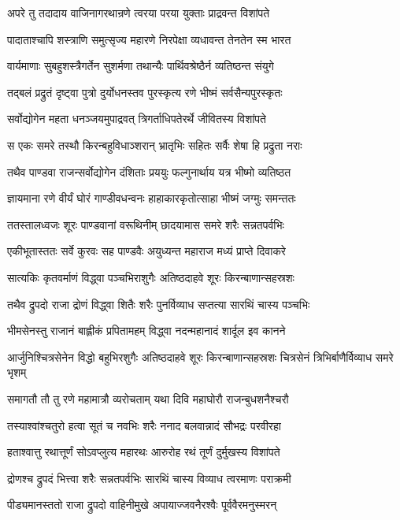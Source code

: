 \twolineshloka
{अपरे तु तदादाय वाजिनागरथान्रणे}
{त्वरया परया युक्ताः प्राद्रवन्त विशांपते}


\twolineshloka
{पादाताश्चापि शस्त्राणि समुत्सृज्य महारणे}
{निरपेक्षा व्यधावन्त तेनतेन स्म भारत}


\twolineshloka
{वार्यमाणाः सुबहुशस्त्रैगर्तेन सुशर्मणा}
{तथान्यैः पार्थिवश्रेष्ठैर्न व्यतिष्ठन्त संयुगे}


\twolineshloka
{तद्बलं प्रद्रुतं दृष्ट्वा पुत्रो दुर्योधनस्तव}
{पुरस्कृत्य रणे भीष्मं सर्वसैन्यपुरस्कृतः}


\twolineshloka
{सर्वोद्योगेन महता धनञ्जयमुपाद्रवत्}
{त्रिगर्ताधिपतेरर्थे जीवितस्य विशांपते}


\twolineshloka
{स एकः समरे तस्थौ किरन्बहुविधाञ्शरान्}
{भ्रातृभिः सहितः सर्वैः शेषा हि प्रद्रुता नराः}


\twolineshloka
{तथैव पाण्डवा राजन्सर्वोद्योगेन दंशिताः}
{प्रययुः फल्गुनार्थाय यत्र भीष्मो व्यतिष्ठत}


\twolineshloka
{ज्ञायमाना रणे वीर्यं घोरं गाण्डीवधन्वनः}
{हाहाकारकृतोत्साहा भीष्मं जग्मुः समन्ततः}


\twolineshloka
{ततस्तालध्वजः शूरः पाण्डवानां वरूथिनीम्}
{छादयामास समरे शरैः सन्नतपर्वभिः}


\twolineshloka
{एकीभूतास्ततः सर्वे कुरवः सह पाण्डवैः}
{अयुध्यन्त महाराज मध्यं प्राप्ते दिवाकरे}


\twolineshloka
{सात्यकिः कृतवर्माणं विद्ध्वा पञ्चभिराशुगैः}
{अतिष्ठदाहवे शूरः किरन्बाणान्सहस्रशः}


\twolineshloka
{तथैव द्रुपदो राजा द्रोणं विद्ध्वा शितैः शरैः}
{पुनर्विव्याध सप्तत्या सारथिं चास्य पञ्चभिः}


\twolineshloka
{भीमसेनस्तु राजानं बाह्लीकं प्रपितामहम्}
{विद्ध्वा नदन्महानादं शार्दूल इव कानने}


\threelineshloka
{आर्जुनिश्चित्रसेनेन विद्धो बहुभिरशुगैः}
{अतिष्ठदाहवे शूरः किरन्बाणान्सहस्रशः}
{चित्रसेनं त्रिभिर्बाणैर्विव्याध समरे भृशम्}


\twolineshloka
{समागतौ तौ तु रणे महामात्रौ व्यरोचताम्}
{यथा दिवि महाघोरौ राजन्बुधशनैश्चरौ}


\twolineshloka
{तस्याश्वांश्चतुरो हत्वा सूतं च नवभिः शरैः}
{ननाद बलवान्नादं सौभद्रः परवीरहा}


\twolineshloka
{हताश्वात्तु रथात्तूर्णं सोऽवप्लुत्य महारथः}
{आरुरोह रथं तूर्णं दुर्मुखस्य विशांपते}


\twolineshloka
{द्रोणश्च द्रुपदं भित्त्वा शरैः सन्नतपर्वभिः}
{सारथिं चास्य विव्याध त्वरमाणः पराक्रमी}


\twolineshloka
{पीड्यमानस्ततो राजा द्रुपदो वाहिनीमुखे}
{अपायाज्जवनैरश्वैः पूर्ववैरमनुस्मरन्}


